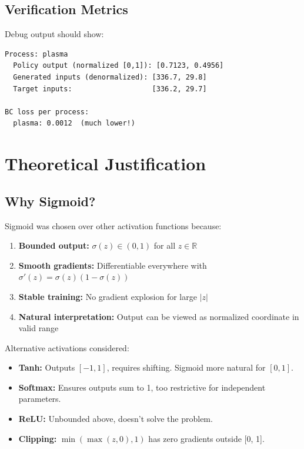 \documentclass[11pt,a4paper]{article}
\begin{document}
\subsection{Verification Metrics}

Debug output should show:
\begin{verbatim}
Process: plasma
  Policy output (normalized [0,1]): [0.7123, 0.4956]
  Generated inputs (denormalized): [336.7, 29.8]
  Target inputs:                   [336.2, 29.7]

BC loss per process:
  plasma: 0.0012  (much lower!)
\end{verbatim}

\section{Theoretical Justification}

\subsection{Why Sigmoid?}

Sigmoid was chosen over other activation functions because:

\begin{enumerate}
    \item \textbf{Bounded output:} $\sigma(z) \in (0, 1)$ for all $z \in \mathbb{R}$
    \item \textbf{Smooth gradients:} Differentiable everywhere with $\sigma'(z) = \sigma(z)(1-\sigma(z))$
    \item \textbf{Stable training:} No gradient explosion for large $|z|$
    \item \textbf{Natural interpretation:} Output can be viewed as normalized coordinate in valid range
\end{enumerate}

Alternative activations considered:
\begin{itemize}
    \item \textbf{Tanh:} Outputs $[-1, 1]$, requires shifting. Sigmoid more natural for $[0, 1]$.
    \item \textbf{Softmax:} Ensures outputs sum to 1, too restrictive for independent parameters.
    \item \textbf{ReLU:} Unbounded above, doesn't solve the problem.
    \item \textbf{Clipping:} $\min(\max(z, 0), 1)$ has zero gradients outside [0, 1].
\end{itemize}
\end{document}
